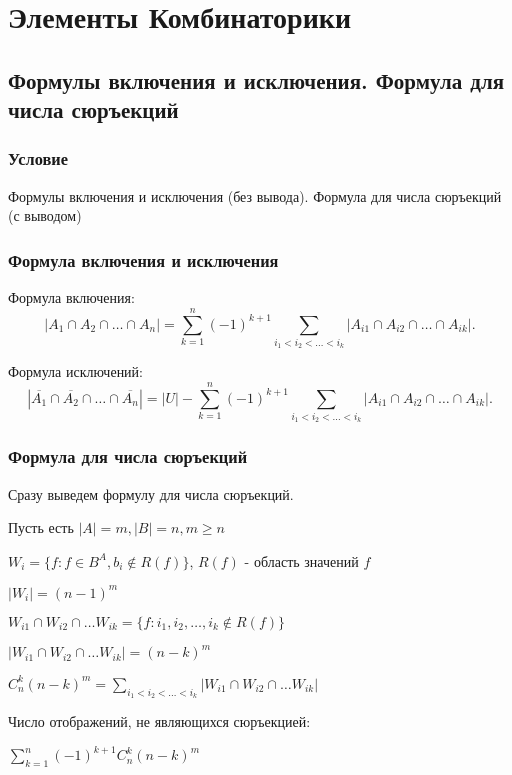 \documentclass{report}
\begin{document}
\newpage

\chapter{Элементы Комбинаторики}
\section{Формулы включения и исключения. Формула для числа сюръекций}
\subsection{Условие}
Формулы включения и исключения (без вывода). Формула для числа сюръекций (с
выводом)

\subsection{Формула включения и исключения}
Формула включения:
\[
|A_1 \cap A_2 \cap \ldots \cap A_{n}| = \sum_{k=1}^{n}(-1)^{k+1} \sum_{i_1<i_2<\ldots < i_{k}}
|A_{i1} \cap A_{i2} \cap \ldots \cap A_{ik}|
.\] 

Формула исключений:
\[
|\overline{A_1} \cap \overline{A_2} \cap \ldots \cap \overline{A_{n}}| = 
|U| - \sum_{k=1}^{n}(-1)^{k+1} \sum_{i_1<i_2<\ldots < i_{k}}
|A_{i1} \cap A_{i2} \cap \ldots \cap A_{ik}|
.\] 

\subsection{Формула для числа сюръекций}
Сразу выведем формулу для числа сюръекций.

\medskip

Пусть есть $|A| = m, |B| = n, m \ge  n$

$W_{i} = \{f: f \in  B^{A}, b_{i} \not\in R(f)\} $, $R(f)$ - область значений  $f$

 $|W_{i}| = (n - 1)^{m}$

 \medskip

$W_{i1} \cap W_{i2} \cap \ldots W_{ik} = \{f: i_1,i_2,\ldots,i_{k} \not\in R(f)\} $

$|W_{i1} \cap W_{i2} \cap \ldots W_{ik}| = (n-k)^{m}$ 

$C_{n}^{k}(n-k)^{m} = \sum_{i_1<i_2<\ldots < i_{k}} |W_{i1} \cap W_{i2} \cap \ldots W_{ik}|$

\medskip

Число отображений, не являющихся сюръекцией:

$\sum_{k=1}^{n}(-1)^{k+1} C_{n}^{k}(n-k)^{m} $ 
\end{document}
